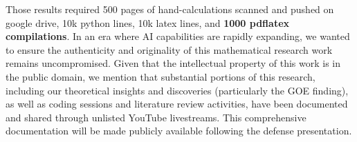 \documentclass[a4paper]{article}
\theoremstyle{plain}
\theoremstyle{definition}
\theoremstyle{remark}
\begin{document}
Those results required 500 pages of hand-calculations scanned and pushed on google drive, 10k python lines, 10k latex lines,  and  \textbf{1000 pdflatex compilations}.
In an era where AI capabilities are rapidly expanding, we wanted to ensure the authenticity and 
originality of this mathematical research work remains uncompromised. Given that the intellectual property of this work is 
in the public domain, we mention that substantial portions of this research, including our theoretical insights 
and discoveries (particularly the GOE finding), as well as coding sessions and literature review activities, have 
been documented and shared through unlisted YouTube livestreams. This comprehensive documentation will be made 
publicly available following the defense presentation.
\end{document}
